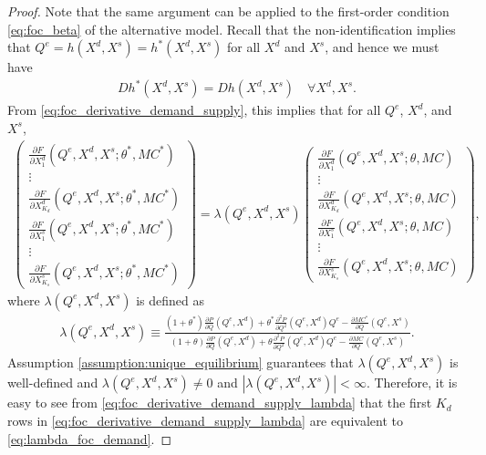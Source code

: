\documentclass[11pt, a4paper]{article}
\theoremstyle{remark}
\begin{document}
\begin{proof}
Note that the same argument can be applied to the first-order condition \eqref{eq:foc_beta} of the alternative model.
Recall that the non-identification implies that $Q^e = h(X^{d}, X^{s}) = h^{*}(X^{d}, X^{s})$ for all $X^{d}$ and $X^{s}$, and hence we must have
\begin{align}
    Dh^{*}(X^{d}, X^{s}) = Dh(X^{d}, X^{s}) \quad \forall X^{d}, X^{s}. \label{eq:observale_equivalence_derivative}
\end{align}
From \eqref{eq:foc_derivative_demand_supply}, this implies that for all $Q^e$, $X^{d}$, and $X^{s}$,
\begin{align}
    \begin{pmatrix}
        \frac{\partial F}{\partial X^{d}_{1}}(Q^e, X^{d}, X^{s}; \theta^{*}, MC^{*})\\
        \vdots \\
        \frac{\partial F}{\partial X^{d}_{K_d}}(Q^e, X^{d}, X^{s}; \theta^{*}, MC^{*})\\
        \frac{\partial F}{\partial X^{s}_{1}}(Q^e, X^{d}, X^{s}; \theta^{*}, MC^{*})\\
        \vdots \\
        \frac{\partial F}{\partial X^{s}_{K_s}}(Q^e, X^{d}, X^{s}; \theta^{*}, MC^{*})
    \end{pmatrix}
    = \lambda(Q^e, X^{d}, X^{s})
    \begin{pmatrix}
        \frac{\partial F}{\partial X^{d}_{1}}(Q^e, X^{d}, X^{s}; \theta, MC)\\
        \vdots \\
        \frac{\partial F}{\partial X^{d}_{K_d}}(Q^e, X^{d}, X^{s}; \theta, MC)\\
        \frac{\partial F}{\partial X^{s}_{1}}(Q^e, X^{d}, X^{s}; \theta, MC)\\
        \vdots \\
        \frac{\partial F}{\partial X^{s}_{K_s}}(Q^e, X^{d}, X^{s}; \theta, MC)
    \end{pmatrix},\label{eq:foc_derivative_demand_supply_lambda}
\end{align}
where $\lambda(Q^e, X^{d}, X^{s})$ is defined as
\begin{align}
    \lambda(Q^e, X^{d}, X^{s}) \equiv \frac{(1+\theta^{*})\frac{\partial P}{\partial Q}(Q^e, X^{d}) + \theta^{*}\frac{\partial^2 P}{\partial Q^2}(Q^e, X^{d})Q^e - \frac{\partial MC^{*}}{\partial Q}(Q^e, X^{s})}{(1+\theta)\frac{\partial P}{\partial Q}(Q^e, X^{d}) + \theta\frac{\partial^2 P}{\partial Q^2}(Q^e, X^{d})Q^e - \frac{\partial MC}{\partial Q}(Q^e, X^{s})}. \label{eq:lambda_foc}
\end{align}
Assumption \ref{assumption:unique_equilibrium} guarantees that $\lambda(Q^e, X^{d}, X^{s})$ is well-defined and $\lambda(Q^e, X^{d}, X^{s}) \ne 0$ and $|\lambda(Q^e, X^{d}, X^{s})| < \infty$.
Therefore, it is easy to see from \eqref{eq:foc_derivative_demand_supply_lambda} that the first $K_d$ rows in \eqref{eq:foc_derivative_demand_supply_lambda} are equivalent to \eqref{eq:lambda_foc_demand}.
\end{proof}
\end{document}
